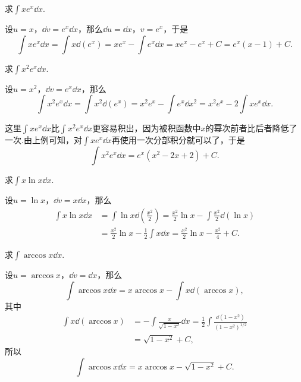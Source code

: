 \begin{example}
求\(\int x e^x \dd{x}\).
\begin{solution}
设\(u = x\)，\(\dd{v} = e^x \dd{x}\)，那么\(\dd{u} = \dd{x}\)，\(v = e^x\)，于是\[
\int x e^x \dd{x}
= \int x \dd(e^x)
= x e^x - \int e^x \dd{x}
= x e^x - e^x + C
= e^x (x - 1) + C.
\]
\end{solution}
\end{example}

\begin{example}
求\(\int x^2 e^x \dd{x}\).
\begin{solution}
设\(u = x^2\)，\(\dd{v} = e^x \dd{x}\)，那么\[
\int x^2 e^x \dd{x}
= \int x^2 \dd(e^x)
= x^2 e^x - \int e^x \dd{x^2}
= x^2 e^x - 2 \int x e^x \dd{x}.
\]

这里\(\int x e^x \dd{x}\)比\(\int x^2 e^x \dd{x}\)更容易积出，因为被积函数中\(x\)的幂次前者比后者降低了一次.由上例可知，对\(\int x e^x \dd{x}\)再使用一次分部积分就可以了，于是\[
\int x^2 e^x \dd{x} = e^x (x^2 -2x + 2) + C.
\]
\end{solution}
\end{example}

\begin{example}
求\(\int x \ln x \dd{x}\).
\begin{solution}
设\(u=\ln x\)，\(\dd{v} = x \dd{x}\)，那么\begin{align*}
\int x \ln x \dd{x}
&= \int \ln x \dd(\frac{x^2}{2})
= \frac{x^2}{2} \ln x - \int \frac{x^2}{2} \dd(\ln x) \\
&= \frac{x^2}{2} \ln x - \frac{1}{2} \int x \dd{x}
= \frac{x^2}{2} \ln x - \frac{x^2}{4} + C.
\end{align*}
\end{solution}
\end{example}

\begin{example}
求\(\int \arccos x \dd{x}\).
\begin{solution}
设\(u = \arccos x\)，\(\dd{v} = \dd{x}\)，那么\[
\int \arccos x \dd{x} = x \arccos x - \int x \dd(\arccos x),
\]其中\begin{align*}
\int x \dd(\arccos x)
&= -\int \frac{x}{\sqrt{1-x^2}} \dd{x}
= \frac{1}{2} \int \frac{\dd(1-x^2)}{(1-x^2)^{1/2}} \\
&= \sqrt{1-x^2} + C,
\end{align*}所以\[
\int \arccos x \dd{x} = x \arccos x - \sqrt{1-x^2} + C.
\]
\end{solution}
\end{example}

